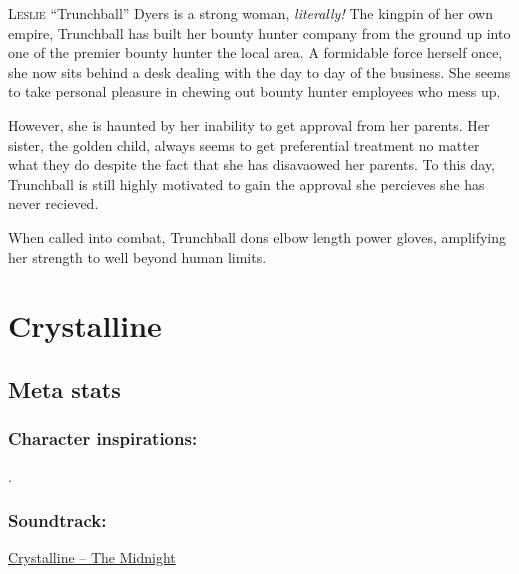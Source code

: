 \documentclass[a4paper,onepage]{memoir}
\begin{document}
\begin{npcdescription}
  \lettrine{L}{eslie} ``Trunchball'' Dyers is a strong woman, \emph{literally!}
  The kingpin of her own empire, Trunchball has built her bounty hunter company
  from the ground up into one of the premier bounty hunter the local area. A
  formidable force herself once, she now sits behind a desk dealing with the day
  to day of the business. She seems to take personal pleasure in chewing out
  bounty hunter employees who mess up.

  However, she is haunted by her inability to get approval from her parents. Her
  sister, the golden child, always seems to get preferential treatment no matter
  what they do despite the fact that she has disavaowed her parents. To this
  day, Trunchball is still highly motivated to gain the approval she percieves
  she has never recieved.

  When called into combat, Trunchball dons elbow length power gloves, amplifying
  her strength to well beyond human limits.
\end{npcdescription}


\section{Crystalline}
\label{sec:Crystalline}

\begin{character*}[Crystalline]
     


\end{character*}


\subsection{Meta stats}
\subsubsection{Character inspirations:} .
\subsubsection{Soundtrack:} \href{https://www.youtube.com/watch?v=s4iLX7eWwmE}{Crystalline -- The Midnight}
\end{document}
